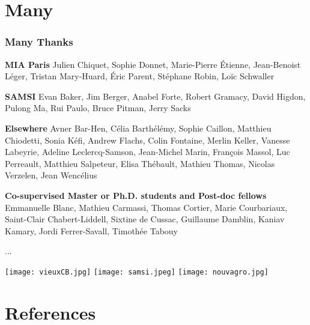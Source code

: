 \documentclass[nopagenumber,9pt]{beamer}
\begin{document}
\section*{Many}
\begin{frame}
\frametitle{Many Thanks}

 \textbf{MIA Paris} Julien Chiquet, Sophie Donnet, Marie-Pierre Étienne, Jean-Benoist Léger, Tristan Mary-Huard, Éric Parent, Stéphane Robin, Loïc Schwaller
 
 
 \textbf{SAMSI} Evan Baker, Jim Berger, Anabel Forte, Robert Gramacy, David Higdon, Pulong Ma, Rui Paulo, Bruce Pitman, Jerry Sacks
 
 
 \textbf{Elsewhere} Avner Bar-Hen, Célia Barthélémy, Sophie Caillon, Matthieu Chiodetti, Sonia Kéfi, Andrew Flachs, Colin Fontaine, Merlin Keller, Vanesse Labeyrie, Adeline Leclercq-Samson, Jean-Michel Marin, François Massol, Luc Perreault, Matthieu Salpeteur, Elisa Thébault, Mathieu Thomas, Nicolas Verzelen, Jean Wencélius
 
 
 \textbf{Co-supervised Master or Ph.D. students and Post-doc fellows}
 Emmanuelle Blanc, Mathieu Carmassi, Thomas Cortier, Marie Courbariaux, Saint-Clair Chabert-Liddell, Sixtine de Cussac, Guillaume Damblin, Kaniav Kamary, Jordi Ferrer-Savall, Timothée Tabouy
 
 ...
 
 
 \texttt{[image: vieuxCB.jpg]}
 \texttt{[image: samsi.jpeg]}
 \texttt{[image: nouvagro.jpg]}
 
\end{frame}




\section*{References}

\tiny


 
\end{document}
